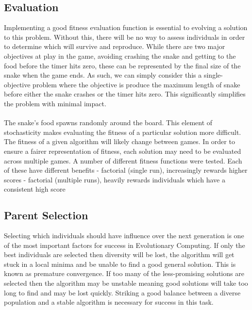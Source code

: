 \documentclass{article}
\begin{document}
\subsection{Evaluation}
\label{fitness_evaluation}
Implementing a good fitness evaluation function is essential to evolving a solution to this problem. Without this, there will be no way to assess individuals in order to determine which will survive and reproduce. While there are two major objectives at play in the game, avoiding crashing the snake and getting to the food before the timer hits zero, these can be represented by the final size of the snake when the game ends. As such, we can simply consider this a single-objective problem where the objective is produce the maximum length of snake before either the snake crashes or the timer hits zero. This significantly simplifies the problem with minimal impact.
\\\\
The snake's food spawns randomly around the board. This element of stochasticity makes evaluating the fitness of a particular solution more difficult. The fitness of a given algorithm will likely change between games. In order to ensure a fairer representation of fitness, each solution may need to be evaluated across multiple games.
A number of different fitness functions were tested.
Each of these have different benefits
- factorial (single run), increasingly rewards higher scores
- factorial (multiple runs), heavily rewards individuals which have a consistent high score

\subsection{Parent Selection}
Selecting which individuals should have influence over the next generation is one of the most important factors for success in Evolutionary Computing. If only the best individuals are selected then diversity will be lost, the algorithm will get stuck in a local minima and be unable to find a good general solution. This is known as premature convergence. If too many of the less-promising solutions are selected then the algorithm may be unstable meaning good solutions will take too long to find and may be lost quickly. Striking a good balance between a diverse population and a stable algorithm is necessary for success in this task.
\end{document}
